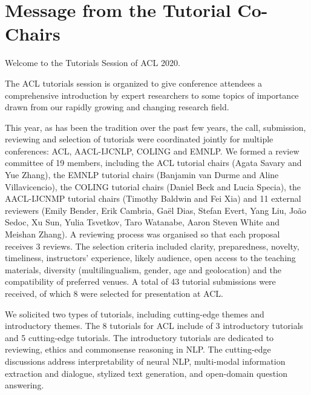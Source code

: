\section{Message from the Tutorial Co-Chairs}\vspace{2em}
\thispagestyle{emptyheader}

\setlength{\parskip}{.7ex}

Welcome to the Tutorials Session of ACL 2020.

The ACL tutorials session is organized to give conference attendees a comprehensive introduction by expert researchers to some topics of importance drawn from our rapidly growing and changing research field.

This year, as has been the tradition over the past few years,  the call, submission, reviewing and selection of tutorials were coordinated jointly for multiple conferences: ACL, AACL-IJCNLP, COLING and EMNLP.
We formed a review committee of 19 members, including the ACL tutorial chairs (Agata Savary and Yue Zhang), the EMNLP tutorial chairs (Banjamin van Durme and Aline Villavicencio), the COLING tutorial chairs (Daniel Beck and Lucia Specia), the AACL-IJCNMP tutorial chairs (Timothy Baldwin and Fei Xia) and 11 external reviewers (Emily Bender, Erik Cambria, Ga\"{e}l Dias, Stefan Evert, Yang Liu, Jo\~{a}o Sedoc, Xu Sun, Yulia Tsvetkov, Taro Watanabe, Aaron Steven White and Meishan Zhang). 
A reviewing process was organised so that each proposal receives 3 reviews. The selection criteria included clarity, preparedness, novelty, timeliness, instructors' experience, likely audience, open access to the teaching materials, diversity (multilingualism, gender, age and geolocation) and the compatibility of preferred venues.
A total of 43 tutorial submissions were received, of which 8 were selected for presentation at ACL.

We solicited two types of tutorials, including cutting-edge themes and introductory themes. The 8 tutorials for ACL include of 3 introductory tutorials and 5 cutting-edge tutorials. The introductory tutorials are dedicated to reviewing, ethics and commonsense reasoning in NLP. The cutting-edge discussions address interpretability of neural NLP, multi-modal information extraction and dialogue, stylized text generation, and open-domain question answering.

